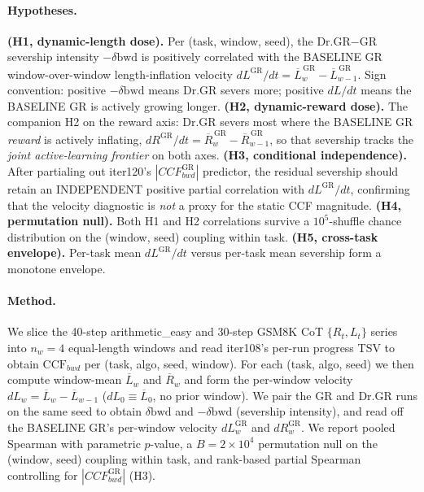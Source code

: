 \paragraph{Hypotheses.}
\textbf{(H1, dynamic-length dose).}  Per (task, window, seed), the
Dr.GR$-$GR severship intensity $-\delta\mathrm{bwd}$ is positively
correlated with the BASELINE GR window-over-window length-inflation
velocity $dL^{\mathrm{GR}}/dt = \overline{L}^{\,\mathrm{GR}}_{w} -
\overline{L}^{\,\mathrm{GR}}_{w-1}$.  Sign convention: positive
$-\delta\mathrm{bwd}$ means Dr.GR severs more; positive $dL/dt$
means the BASELINE GR is actively growing longer.  \textbf{(H2,
dynamic-reward dose).}  The companion H2 on the reward axis:
Dr.GR severs most where the BASELINE GR \emph{reward} is actively
inflating, $dR^{\mathrm{GR}}/dt = \overline{R}^{\,\mathrm{GR}}_{w} -
\overline{R}^{\,\mathrm{GR}}_{w-1}$, so that severship tracks the
\emph{joint active-learning frontier} on both axes.  \textbf{(H3,
conditional independence).}  After partialing out iter120's
$|CCF_{bwd}^{\mathrm{GR}}|$ predictor, the residual severship
should retain an INDEPENDENT positive partial correlation with
$dL^{\mathrm{GR}}/dt$, confirming that the velocity diagnostic is
\emph{not} a proxy for the static CCF magnitude.  \textbf{(H4,
permutation null).}  Both H1 and H2 correlations survive a
$10^{5}$-shuffle chance distribution on the (window, seed) coupling
within task.  \textbf{(H5, cross-task envelope).}  Per-task mean
$dL^{\mathrm{GR}}/dt$ versus per-task mean severship form a monotone
envelope.

\paragraph{Method.}
We slice the 40-step arithmetic\_easy and 30-step GSM8K CoT
$\{R_t,L_t\}$ series into $n_w=4$ equal-length windows and read
iter108's per-run progress TSV to obtain $\mathrm{CCF}_{bwd}$ per
(task, algo, seed, window).  For each (task, algo, seed) we then
compute window-mean $\overline{L}_w$ and $\overline{R}_w$ and form
the per-window velocity $dL_w=\overline{L}_w-\overline{L}_{w-1}$
($dL_0 \equiv \overline{L}_0$, no prior window).  We pair the
GR and Dr.GR runs on the same seed to obtain $\delta\mathrm{bwd}$
and $-\delta\mathrm{bwd}$ (severship intensity), and read off the
BASELINE GR's per-window velocity $dL^{\mathrm{GR}}_w$ and
$dR^{\mathrm{GR}}_w$.  We report pooled Spearman with parametric
$p$-value, a $B=2{\times}10^{4}$ permutation null on the
(window, seed) coupling within task, and rank-based partial
Spearman controlling for $|CCF_{bwd}^{\mathrm{GR}}|$ (H3).

